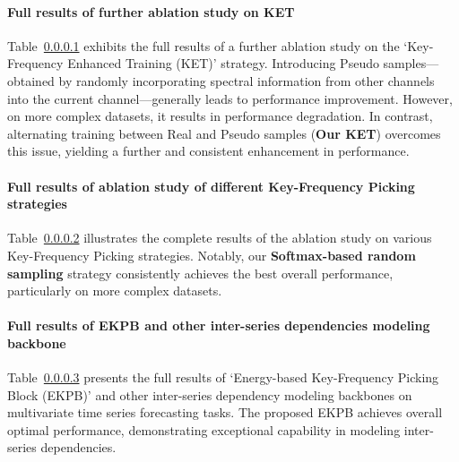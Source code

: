 \paragraph{Full results of further ablation study on KET }
\label{app:full ket}
Table~\ref{app:full ket} exhibits the full results of a further ablation study on the `Key-Frequency Enhanced Training (KET)' strategy. Introducing Pseudo samples—obtained by randomly incorporating spectral information from other channels into the current channel—generally leads to performance improvement. However, on more complex datasets, it results in performance degradation. In contrast, alternating training between Real and Pseudo samples (\textbf{Our KET}) overcomes this issue, yielding a further and consistent enhancement in performance.


\paragraph{Full results of ablation study of different Key-Frequency Picking strategies }
\label{app:full pick}
Table~\ref{app:full pick} illustrates the complete results of the ablation study on various Key-Frequency Picking strategies. Notably, our \textbf{Softmax-based random sampling} strategy consistently achieves the best overall performance, particularly on more complex datasets.



\paragraph{Full results of EKPB and other inter-series dependencies modeling backbone }
\label{app:full ekpb}
Table~\ref{app:full ekpb} presents the full results of `Energy-based Key-Frequency Picking Block (EKPB)' and other inter-series dependency modeling backbones on multivariate time series forecasting tasks. The proposed EKPB achieves overall optimal performance, demonstrating exceptional capability in modeling inter-series dependencies.



